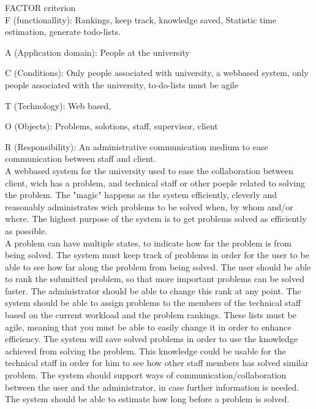 FACTOR criterion\\
F (functionallity): Rankings, keep track, knowledge saved, Statistic time estimation, generate todo-lists.

A (Application domain): People at the university

C (Conditions): Only people associated with university, a webbased system, only people associated with the university, to-do-lists must be agile

T (Technology): Web based, 

O (Objects): Problems, solotions, staff, supervisor, client

R (Responsibility): An administrative communication medium to ease communication between staff and client.\\










A webbased system for the university used to ease the collaboration between client, wich has a problem, and technical staff or other poeple related to solving the problem. The "magic" happens as the system efficiently, cleverly and reasonably administrates wich problems to be solved when, by whom and/or where. The highest purpose of the system is to get problems solved as efficiently as possible.\\



A problem can have multiple states, to indicate how far the problem is from being solved.
The system must keep track of problems in order for the user to be able to see how far along the problem from being solved. The user should be able to rank the submitted problem, so that more important problems can be solved faster. The administrator should be able to change this rank at any point. 
The system should be able to assign problems to the members of the technical staff based on the current workload and the problem rankings. These lists must be agile, meaning that you must be able to easily change it in order to enhance efficiency.
The system will save solved problems in order to use the knowledge achieved from solving the problem. This knowledge could be usable for the technical staff in order for him to see how other staff members has solved similar problem. The system should support ways of communication/collaboration between the user and the administrator, in case further information is needed. The system should be able to estimate how long before a problem is solved.
